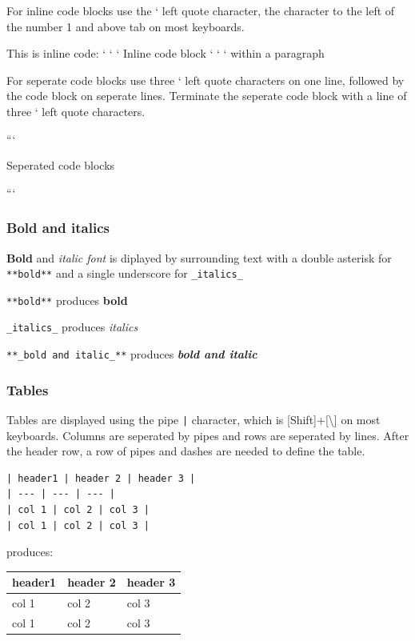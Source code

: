 \documentclass{book}
\begin{document}
For inline code blocks use the ` left quote character, the character to
the left of the number 1 and above tab on most keyboards.

This is inline code: ` ` ` Inline code block ` ` ` within a paragraph

For seperate code blocks use three ` left quote characters on one line,
followed by the code block on seperate lines. Terminate the seperate
code block with a line of three ` left quote characters.

```

Seperated code blocks

```

\subsubsection{Bold and italics}\label{bold-and-italics}

\textbf{Bold} and \emph{italic font} is diplayed by surrounding text
with a double asterisk for \lstinline!**bold**! and a single underscore
for \lstinline!_italics_!

\lstinline!**bold**! produces \textbf{bold}

\lstinline!_italics_! produces \emph{italics}

\lstinline!**_bold and italic_**! produces \textbf{\emph{bold and
italic}}

\subsubsection{Tables}\label{tables}

Tables are displayed using the pipe \lstinline!|! character, which is
{[}Shift{]}+{[}\textbackslash{}{]} on most keyboards. Columns are
seperated by pipes and rows are seperated by lines. After the header
row, a row of pipes and dashes are needed to define the table.

\begin{lstlisting}
| header1 | header 2 | header 3 |
| --- | --- | --- |
| col 1 | col 2 | col 3 |
| col 1 | col 2 | col 3 |
\end{lstlisting}

produces:

\begin{longtable}[]{@{}lll@{}}
\toprule
header1 & header 2 & header 3\tabularnewline
\midrule
\endhead
col 1 & col 2 & col 3\tabularnewline
col 1 & col 2 & col 3\tabularnewline
\bottomrule
\end{longtable}
\end{document}
